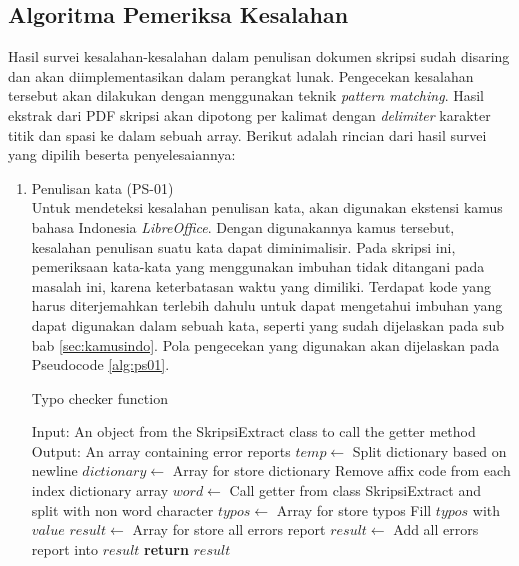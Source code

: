 \subsection{Algoritma Pemeriksa Kesalahan}
Hasil survei kesalahan-kesalahan dalam penulisan dokumen skripsi sudah disaring dan akan diimplementasikan dalam perangkat lunak. Pengecekan kesalahan tersebut akan dilakukan dengan menggunakan teknik \textit{pattern matching}. Hasil ekstrak dari PDF skripsi akan dipotong per kalimat dengan \textit{delimiter} karakter titik dan spasi ke dalam sebuah array. Berikut adalah rincian dari hasil survei yang dipilih beserta penyelesaiannya:

\begin{enumerate}
	\item Penulisan kata (PS-01) \\
	Untuk mendeteksi kesalahan penulisan kata, akan digunakan ekstensi kamus bahasa Indonesia \textit{LibreOffice}. Dengan digunakannya kamus tersebut, kesalahan penulisan suatu kata dapat diminimalisir. Pada skripsi ini, pemeriksaan kata-kata yang menggunakan imbuhan tidak ditangani pada masalah ini, karena keterbatasan waktu yang dimiliki. Terdapat kode yang harus diterjemahkan terlebih dahulu untuk dapat mengetahui imbuhan yang dapat digunakan dalam sebuah kata, seperti yang sudah dijelaskan pada sub bab \ref{sec:kamusindo}. Pola pengecekan yang digunakan akan dijelaskan pada Pseudocode \ref{alg:ps01}.
		
\begin{minipage}{1.0\linewidth}
\begin{algorithm}[H]
    \caption{Typo checker function}
	\label{alg:ps01}
	\begin{algorithmic}[1]
		\State Input: An object from the SkripsiExtract class to call the getter method
		\State Output: An array containing error reports    	
		\State
    		\State $temp \gets$ Split dictionary based on newline
			\State $dictionary \gets$ Array for store dictionary
				\State Remove affix code from each index dictionary array 
			\EndFor
			\State $word \gets$ Call getter from class SkripsiExtract and split with non word character
			\State $typos \gets$ Array for store typos
                	\State Fill $typos$ with $value$
            	\EndIf
        	\EndFor
			\State $result \gets$ Array for store all errors report
                \State $result \gets$ Add all errors report into $result$
            \EndIf
    		\State \textbf{return} $result$
    	\EndFunction
	\end{algorithmic}
\end{algorithm}
\end{minipage}
\medskip


\end{enumerate}
